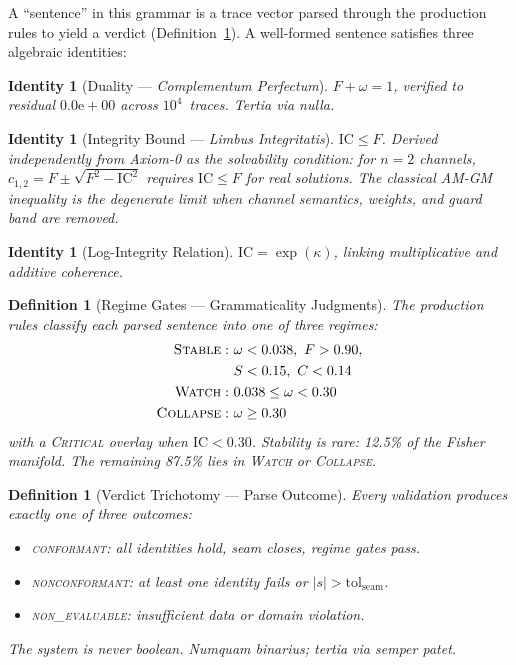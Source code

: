 \documentclass[
  aps,
  prd,
  twocolumn,
  superscriptaddress,
  nofootinbib,
  floatfix
]{revtex4-2}
\newtheorem{definition}[theorem]{Definition}
\newtheorem{identity}[theorem]{Identity}
\newcommand{\tolseam}{\mathrm{tol}_{\mathrm{seam}}}
\newcommand{\regime}[1]{\textrm{\upshape\scshape#1}}
\newcommand{\conform}{\regime{conformant}}
\newcommand{\nonconform}{\regime{nonconformant}}
\newcommand{\Fid}{F}
\newcommand{\Drft}{\omega}
\newcommand{\Ent}{S}
\newcommand{\Curv}{C}
\newcommand{\Logint}{\kappa}
\newcommand{\IC}{\mathrm{IC}}
\newcommand{\lat}[1]{\textit{#1}}
\begin{document}
\noindent
A ``sentence'' in this grammar is a trace vector parsed through
the production rules to yield a verdict (Definition~\ref{def:verdict}).
A well-formed sentence satisfies three algebraic identities:

\begin{identity}[Duality --- \lat{Complementum Perfectum}]
  \label{id:duality}
  $\Fid + \Drft = 1$, verified to residual $0.0\mathrm{e}{+}00$
  across $10^4$~traces. \lat{Tertia via nulla.}
\end{identity}

\begin{identity}[Integrity Bound --- \lat{Limbus Integritatis}]
  \label{id:bound}
  $\IC \leq \Fid$. Derived independently from Axiom-0 as the
  solvability condition: for $n=2$ channels,
  $c_{1,2} = \Fid \pm \sqrt{\Fid^2 - \IC^2}$ requires $\IC \leq \Fid$
  for real solutions. The classical AM-GM inequality is the degenerate
  limit when channel semantics, weights, and guard band are removed.
\end{identity}

\begin{identity}[Log-Integrity Relation]
  \label{id:logint}
  $\IC = \exp(\Logint)$, linking multiplicative and additive coherence.
\end{identity}

\begin{definition}[Regime Gates --- Grammaticality Judgments]
  \label{def:regime}
The production rules classify each parsed sentence into one of three
regimes:
\begin{align*}
  \regime{Stable}:~ &\Drft < 0.038,~ \Fid > 0.90,\\
    &\Ent < 0.15,~ \Curv < 0.14\\
  \regime{Watch}:~ &0.038 \leq \Drft < 0.30\\
  \regime{Collapse}:~ &\Drft \geq 0.30
\end{align*}
with a \regime{Critical} overlay when $\IC < 0.30$.
Stability is rare: 12.5\% of the Fisher manifold. The remaining
87.5\% lies in \regime{Watch} or \regime{Collapse}.
\end{definition}

\begin{definition}[Verdict Trichotomy --- Parse Outcome]
  \label{def:verdict}
Every validation produces exactly one of three outcomes:
\begin{itemize}[nosep,leftmargin=*]
  \item \conform{}: all identities hold, seam closes, regime gates pass.
  \item \nonconform{}: at least one identity fails or $|s| > \tolseam$.
  \item \regime{non\_evaluable}: insufficient data or domain violation.
\end{itemize}
The system is never boolean.
\lat{Numquam binarius; tertia via semper patet.}
\end{definition}
\end{document}
